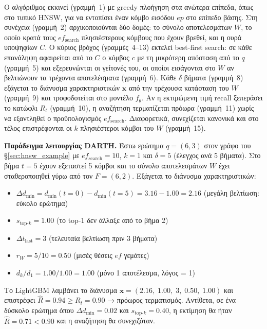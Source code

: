 \documentclass[12pt,a4paper]{article}
\begin{document}
Ο αλγόριθμος εκκινεί (γραμμή~1) με greedy πλοήγηση στα ανώτερα επίπεδα, όπως στο τυπικό HNSW, για να εντοπίσει έναν κόμβο εισόδου $ep$ στο επίπεδο βάσης. Στη συνέχεια (γραμμή~2) αρχικοποιούνται δύο δομές: το σύνολο αποτελεσμάτων $W$, το οποίο κρατά τους $ef_{\text{search}}$ πλησιέστερους κόμβους που έχουν βρεθεί, και η ουρά υποψηφίων $C$. Ο κύριος βρόχος (γραμμές~4--13) εκτελεί best-first search: σε κάθε επανάληψη αφαιρείται από το $C$ ο κόμβος $c$ με τη μικρότερη απόσταση από το $q$ (γραμμή~5) και εξερευνώνται οι γείτονές του, οι οποίοι εισάγονται στο $W$ αν βελτιώνουν τα τρέχοντα αποτελέσματα (γραμμή~6). Κάθε $\delta$ βήματα (γραμμή~8) εξάγεται το διάνυσμα χαρακτηριστικών $\mathbf{x}$ από την τρέχουσα κατάσταση του $W$ (γραμμή~9) και τροφοδοτείται στο μοντέλο $f_\theta$. Αν η εκτιμώμενη τιμή recall ξεπεράσει το κατώφλι $R_t$ (γραμμή~10), η αναζήτηση τερματίζεται πρόωρα (γραμμή~11) χωρίς να εξαντληθεί ο προϋπολογισμός $ef_{\text{search}}$. Διαφορετικά, συνεχίζεται κανονικά και στο τέλος επιστρέφονται οι $k$ πλησιέστεροι κόμβοι του $W$ (γραμμή~15).

\textbf{Παράδειγμα λειτουργίας DARTH.}
Έστω ερώτημα $q = (6,3)$ στον γράφο του §\ref{sec:hnsw_example} με $ef_{\text{search}} = 10$, $k = 1$ και $\delta = 5$ (έλεγχος ανά 5 βήματα). Στο βήμα $t = 5$ έχουν εξεταστεί 5 κόμβοι και το σύνολο αποτελεσμάτων $W$ έχει σταθεροποιηθεί γύρω από τον $F = (6,2)$. Εξάγεται το διάνυσμα χαρακτηριστικών:

\begin{itemize}
    \item $\Delta d_{\min} = d_{\min}(t{=}0) - d_{\min}(t{=}5) = 3.16 - 1.00 = 2.16$ \quad (μεγάλη βελτίωση: εύκολο ερώτημα)
    \item $s_{\text{top-}k} = 1.00$ \quad (το top-1 δεν άλλαξε από το βήμα 2)
    \item $\Delta t_{\text{last}} = 3$ \quad (τελευταία βελτίωση πριν 3 βήματα)
    \item $r_W = 5/10 = 0.50$ \quad (μισές θέσεις $ef$ γεμάτες)
    \item $d_k / d_1 = 1.00 / 1.00 = 1.00$ \quad (μόνο 1 αποτέλεσμα, λόγος = 1)
\end{itemize}

Το LightGBM λαμβάνει το διάνυσμα $\mathbf{x} = (2.16,\; 1.00,\; 3,\; 0.50,\; 1.00)$ και επιστρέφει $\hat{R} = 0.94 \geq R_t = 0.90$ → πρόωρος τερματισμός. Αντίθετα, σε ένα δύσκολο ερώτημα όπου $\Delta d_{\min} = 0.02$ και $s_{\text{top-}k} = 0.40$, η εκτίμηση θα ήταν $\hat{R} = 0.71 < 0.90$ και η αναζήτηση θα συνεχιζόταν.
\end{document}
